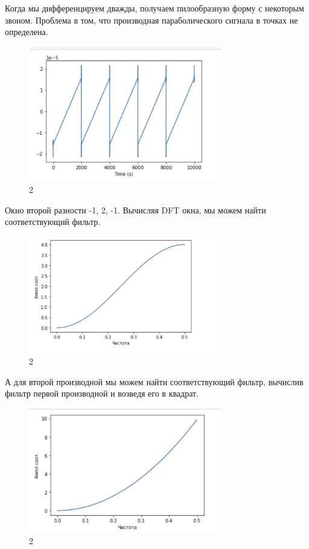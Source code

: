 \documentclass[10pt,a4paper,oneside]{article}
\begin{document}
Когда мы дифференцируем дважды, получаем пилообразную форму с некоторым звоном. Проблема в том, что производная параболического сигнала в точках не определена.

\begin{figure}[H]
        \centering
        \includegraphics[width=0.75\textwidth]{pics/16.png}
        \caption{2}
        \label{fig:first}
\end{figure}

Окно второй разности -1, 2, -1. Вычисляя DFT окна, мы можем найти соответствующий фильтр.

\begin{figure}[H]
        \centering
        \includegraphics[width=0.75\textwidth]{pics/17.png}
        \caption{2}
        \label{fig:first}
\end{figure}

А для второй производной мы можем найти соответствующий фильтр, вычислив фильтр первой производной и возведя его в квадрат.

\begin{figure}[H]
        \centering
        \includegraphics[width=0.75\textwidth]{pics/18.png}
        \caption{2}
        \label{fig:first}
\end{figure}
\end{document}
